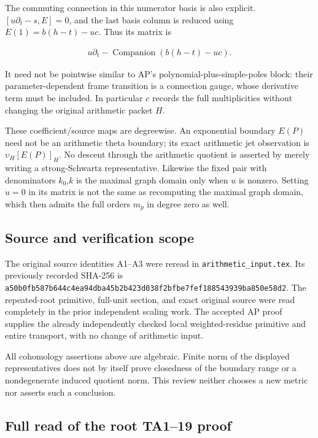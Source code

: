 The commuting connection in this numerator basis is also explicit.
\([u\partial_t-s,E]=0\), and the last basis column is reduced using
\(E(1)=b(h-t)-uc\). Thus its matrix is


\[
\begin{gathered}
u\partial_t-\operatorname{Companion}(b(h-t)-uc).
\end{gathered}
\]


It need not be pointwise similar to AP's polynomial-plus-simple-poles
block: their parameter-dependent frame transition is a connection gauge,
whose derivative term must be included. In particular \(c\) records the full
multiplicities without changing the original arithmetic packet \(H\).


These coefficient/source maps are degreewise. An exponential boundary
\(E(P)\) need not be an arithmetic theta boundary; its exact arithmetic
jet observation is \(\upsilon_H[E(P)]_H\). No descent through the arithmetic
quotient is asserted by merely writing a strong-Schwartz representative.
Likewise the fixed pair with denominators \(k_0\),\(k\) is the maximal graph
domain only when \(u\) is nonzero. Setting \(u=0\) in its matrix is not the same
as recomputing the maximal graph domain, which then admits the full
orders \(m_p\) in degree zero as well.


\subsection*{Source and verification scope}


The original source identities A1--A3 were reread in
\texttt{arithmetic\_\allowbreak{}input.tex}.
Its previously recorded SHA-256 is
{\small\texttt{a50b0fb5\allowbreak{}87b644c4\allowbreak{}ea94dba4\allowbreak{}5b2b423d\allowbreak{}038f2bfb\allowbreak{}e7fef188\allowbreak{}543939ba\allowbreak{}850e58d2}}.
The repeated-root primitive, full-unit section, and exact original source
were read completely in the prior independent scaling work. The accepted
AP proof supplies the already independently checked local weighted-residue
primitive and entire transport, with no change of arithmetic input.


All cohomology assertions above are algebraic. Finite norm of the displayed
representatives does not by itself prove closedness of the boundary range
or a nondegenerate induced quotient norm. This review neither chooses a
new metric nor asserts such a conclusion.


\subsection*{Full read of the root TA1--19 proof}


